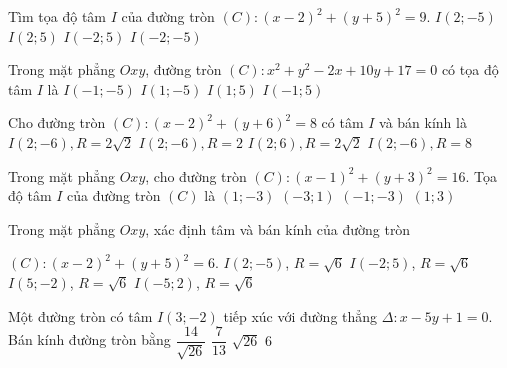 \begin{ex}%
	Tìm tọa độ tâm $I$ của  đường tròn $(C)\colon(x-2)^2+(y+5)^2=9$.
	\choice 
		{\True  $I(2;-5)$}
		 {$I(2;5)$}
		 {$I(-2;5)$}
		{$I(-2;-5)$} 
\end{ex}

\begin{ex}%
	Trong  mặt phẳng $Oxy$, đường tròn $(C)\colon x^2+y^2-2 x+10 y+17=0$ có tọa độ tâm $I$ là
	 \choice
		 {$I(-1;-5)$}
		{\True $I(1;-5)$} 
		 {$I(1;5)$}
		 {$I(-1;5)$}
\end{ex}

\begin{ex}%
	Cho  đường tròn $\left(C\right)\colon (x-2)^2+(y+6)^2=8$ có tâm $I$ và bán kính là
	 \choice
		{\True  $I(2;-6),R=2\sqrt{2}$}
		 {$I(2;-6),R=2$}
		{$I(2;6),R=2\sqrt{2}$} 
		 {$I(2;-6),R=8$}
\end{ex}

\begin{ex}%
	Trong mặt phẳng $Oxy$, cho đường tròn $(C)\colon \left(x-1\right)^2+\left(y+3\right)^2=16$. Tọa độ tâm $I$ của đường  tròn $(C)$ là
	 \choice
		{\True  $\left(1;-3\right)$}
		{$\left(-3;1\right)$} 
		 {$\left(-1;-3\right)$}
		 {$\left(1;3\right)$}
\end{ex}

\begin{ex}%
	Trong mặt phẳng $Oxy$, xác định tâm và bán kính của đường  tròn
	\par $(C)\colon (x-2)^{2}+(y+5)^{2}=6$. 
	\choice 
		{\True $I(2;-5)$, $R=\sqrt{6}$} 
		{$I(-2;5)$, $R=\sqrt{6}$} 
		{$I(5;-2)$,  $R=\sqrt{6}$}
		{$I(-5;2)$, $R=\sqrt{6}$} 
\end{ex}

\begin{ex}%
	Một đường tròn có  tâm $I(3;-2)$ tiếp xúc với đường thẳng $\Delta\colon x-5y+1=0$. Bán kính đường tròn bằng
	\choice 
		{\True $\dfrac{14}{\sqrt{26}}$} 
		{$\dfrac{7}{13}$} 
		{$\sqrt{26}$} 
		 {$6$}
\end{ex}


